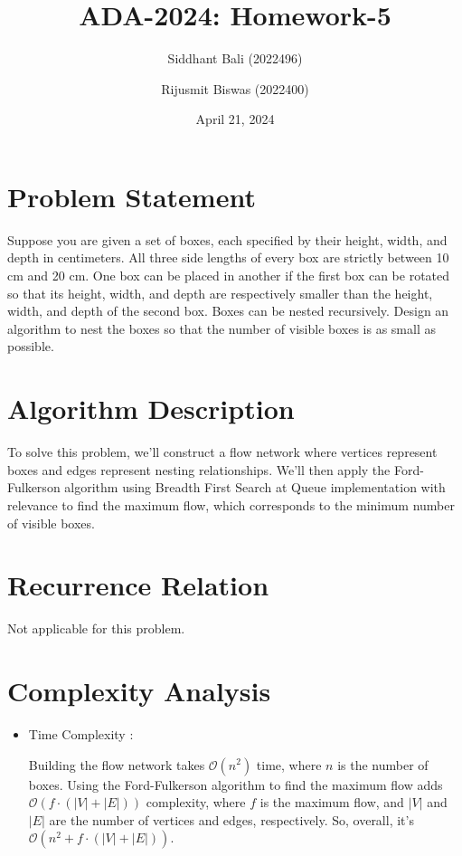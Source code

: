 \documentclass{article}
\title{ADA-2024: Homework-5}
\author{Siddhant Bali (2022496) \and Rijusmit Biswas (2022400)}
\date{April 21, 2024}
\begin{document}
\maketitle

\section{Problem Statement}
Suppose you are given a set of boxes, each specified by their height, width, and depth in centimeters. All three side lengths of every box are strictly between 10 cm and 20 cm. One box can be placed in another if the first box can be rotated so that its height, width, and depth are respectively smaller than the height, width, and depth of the second box. Boxes can be nested recursively. Design an algorithm to nest the boxes so that the number of visible boxes is as small as possible.

\section{Algorithm Description}
To solve this problem, we'll construct a flow network where vertices represent boxes and edges represent nesting relationships. We'll then apply the Ford-Fulkerson algorithm using Breadth First Search at Queue implementation with relevance to find the maximum flow, which corresponds to the minimum number of visible boxes.

\section{Recurrence Relation}
Not applicable for this problem.

\section{Complexity Analysis}

\begin{itemize}
    \item Time Complexity :
    
    Building the flow network takes $\mathcal{O}(n^2)$ time, where $n$ is the number of boxes. Using the Ford-Fulkerson algorithm to find the maximum flow adds $\mathcal{O}(f \cdot (|V| + |E|))$ complexity, where $f$ is the maximum flow, and $|V|$ and $|E|$ are the number of vertices and edges, respectively. So, overall, it's $\mathcal{O}(n^2 + f \cdot (|V| + |E|))$.

\end{itemize}
\end{document}
